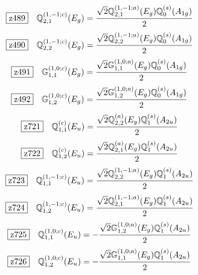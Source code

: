 \documentclass[fleqn,10pt,landscape]{jsarticle}
\begin{document}
\begin{dmath*}
\hspace*{3mm}\fbox{z489}\quad \mathbb{Q}_{2,1}^{(1,-1;c)}(E_{g})=\frac{\sqrt{2} \mathbb{Q}_{2,1}^{(1,-1;a)}(E_{g}) \mathbb{Q}_{0}^{(s)}(A_{1g})}{2}
\end{dmath*}
\begin{dmath*}
\hspace*{3mm}\fbox{z490}\quad \mathbb{Q}_{2,2}^{(1,-1;c)}(E_{g})=\frac{\sqrt{2} \mathbb{Q}_{2,2}^{(1,-1;a)}(E_{g}) \mathbb{Q}_{0}^{(s)}(A_{1g})}{2}
\end{dmath*}
\begin{dmath*}
\hspace*{3mm}\fbox{z491}\quad \mathbb{G}_{1,1}^{(1,0;c)}(E_{g})=\frac{\sqrt{2} \mathbb{G}_{1,1}^{(1,0;a)}(E_{g}) \mathbb{Q}_{0}^{(s)}(A_{1g})}{2}
\end{dmath*}
\begin{dmath*}
\hspace*{3mm}\fbox{z492}\quad \mathbb{G}_{1,2}^{(1,0;c)}(E_{g})=\frac{\sqrt{2} \mathbb{G}_{1,2}^{(1,0;a)}(E_{g}) \mathbb{Q}_{0}^{(s)}(A_{1g})}{2}
\end{dmath*}
\begin{dmath*}
\hspace*{3mm}\fbox{z721}\quad \mathbb{Q}_{1,1}^{(c)}(E_{u})=\frac{\sqrt{2} \mathbb{Q}_{2,2}^{(a)}(E_{g}) \mathbb{Q}_{1}^{(s)}(A_{2u})}{2}
\end{dmath*}
\begin{dmath*}
\hspace*{3mm}\fbox{z722}\quad \mathbb{Q}_{1,2}^{(c)}(E_{u})=\frac{\sqrt{2} \mathbb{Q}_{2,1}^{(a)}(E_{g}) \mathbb{Q}_{1}^{(s)}(A_{2u})}{2}
\end{dmath*}
\begin{dmath*}
\hspace*{3mm}\fbox{z723}\quad \mathbb{Q}_{1,1}^{(1,-1;c)}(E_{u})=\frac{\sqrt{2} \mathbb{Q}_{2,2}^{(1,-1;a)}(E_{g}) \mathbb{Q}_{1}^{(s)}(A_{2u})}{2}
\end{dmath*}
\begin{dmath*}
\hspace*{3mm}\fbox{z724}\quad \mathbb{Q}_{1,2}^{(1,-1;c)}(E_{u})=\frac{\sqrt{2} \mathbb{Q}_{2,1}^{(1,-1;a)}(E_{g}) \mathbb{Q}_{1}^{(s)}(A_{2u})}{2}
\end{dmath*}
\begin{dmath*}
\hspace*{3mm}\fbox{z725}\quad \mathbb{Q}_{1,1}^{(1,0;c)}(E_{u})=- \frac{\sqrt{2} \mathbb{G}_{1,2}^{(1,0;a)}(E_{g}) \mathbb{Q}_{1}^{(s)}(A_{2u})}{2}
\end{dmath*}
\begin{dmath*}
\hspace*{3mm}\fbox{z726}\quad \mathbb{Q}_{1,2}^{(1,0;c)}(E_{u})=- \frac{\sqrt{2} \mathbb{G}_{1,1}^{(1,0;a)}(E_{g}) \mathbb{Q}_{1}^{(s)}(A_{2u})}{2}
\end{dmath*}
\vspace{5mm}
\end{document}
